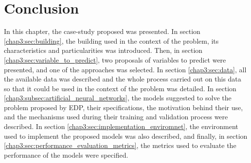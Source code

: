 \section{Conclusion}\label{chap3:sec:conclusion}

In this chapter, the case-study proposed was presented. In section \ref{chap3:sec:building}, the building used in the context of the problem, its characteristics and particularities was introduced. Then, in section \ref{chap3:sec:variable_to_predict}, two proposals of variables to predict were presented, and one of the approaches was selected. In section \ref{chap3:sec:data}, all the available data was described and the whole process carried out on this data so that it could be used in the context of the problem was detailed. In section \ref{chap3:subsec:artificial_neural_networks}, the models suggested to solve the problem proposed by \ac{EDP}, their specifications, the motivation behind their use, and the mechanisms used during their training and validation process were described. In section \ref{chap3:sec:implementation_enviromnet}, the environment used to implement the proposed models was also described, and finally, in section \ref{chap3:sec:performance_evaluation_metrics}, the metrics used to evaluate the performance of the models were specified.